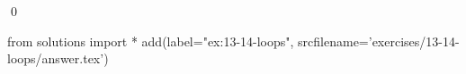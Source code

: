 
\begin{ex}
  \label{ex:13-14-loops}
  
  \qed
\end{ex}
\begin{python0}
from solutions import *
add(label="ex:13-14-loops",
    srcfilename='exercises/13-14-loops/answer.tex')
\end{python0}
